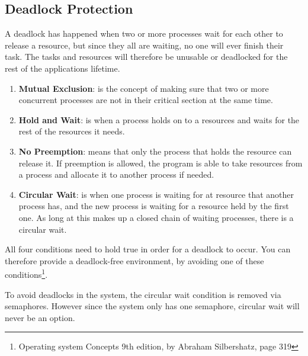 \subsection{Deadlock Protection}
\label{sec:DeadlockProtection}

A deadlock has happened when two or more processes wait for each other to release a resource, but since they all are waiting, no one will ever finish their task. The tasks and resources will therefore be unusable or deadlocked for the rest of the applications lifetime. 


\begin{enumerate}[noitemsep]
	
	\item \textbf{Mutual Exclusion}: is the concept of making sure that two or more concurrent processes are not in their critical section at the same time. 
	
	\item \textbf{Hold and Wait}: is when a process holds on to a resources and waits for the rest of the resources it needs.
	
	\item \textbf{No Preemption}: means that only the process that holds the resource can release it. If preemption is allowed, the program is able to take resources from a process and allocate it to another process if needed.
	
	\item \textbf{Circular Wait}: is when one process is waiting for at resource that another process has, and the new process is waiting for a resource held by the first one. As long at this makes up a closed chain of waiting processes, there is a circular wait.

	
\end{enumerate}

All four conditions need to hold true in order for a deadlock to occur. You can therefore provide a deadlock-free environment, by avoiding one of these conditions\footnote{Operating system Concepts 9th edition, by Abraham Silbershatz, page 319}. 

To avoid deadlocks in the system, the circular wait condition is removed via semaphores. However since the system only has one semaphore, circular wait will never be an option. 

